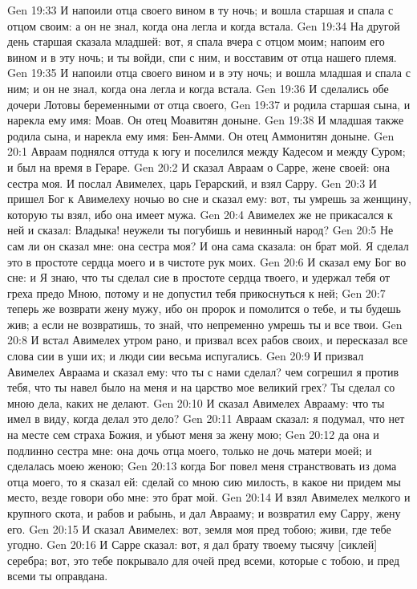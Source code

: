 Gen 19:33  И напоили отца своего вином в ту ночь; и вошла старшая и спала с отцом своим: а он не знал, когда она легла и когда встала.
Gen 19:34  На другой день старшая сказала младшей: вот, я спала вчера с отцом моим; напоим его вином и в эту ночь; и ты войди, спи с ним, и восставим от отца нашего племя.
Gen 19:35  И напоили отца своего вином и в эту ночь; и вошла младшая и спала с ним; и он не знал, когда она легла и когда встала.
Gen 19:36  И сделались обе дочери Лотовы беременными от отца своего,
Gen 19:37  и родила старшая сына, и нарекла ему имя: Моав. Он отец Моавитян доныне.
Gen 19:38  И младшая также родила сына, и нарекла ему имя: Бен-Амми. Он отец Аммонитян доныне.
Gen 20:1  Авраам поднялся оттуда к югу и поселился между Кадесом и между Суром; и был на время в Гераре.
Gen 20:2  И сказал Авраам о Сарре, жене своей: она сестра моя. И послал Авимелех, царь Герарский, и взял Сарру.
Gen 20:3  И пришел Бог к Авимелеху ночью во сне и сказал ему: вот, ты умрешь за женщину, которую ты взял, ибо она имеет мужа.
Gen 20:4  Авимелех же не прикасался к ней и сказал: Владыка! неужели ты погубишь и невинный народ?
Gen 20:5  Не сам ли он сказал мне: она сестра моя? И она сама сказала: он брат мой. Я сделал это в простоте сердца моего и в чистоте рук моих.
Gen 20:6  И сказал ему Бог во сне: и Я знаю, что ты сделал сие в простоте сердца твоего, и удержал тебя от греха предо Мною, потому и не допустил тебя прикоснуться к ней;
Gen 20:7  теперь же возврати жену мужу, ибо он пророк и помолится о тебе, и ты будешь жив; а если не возвратишь, то знай, что непременно умрешь ты и все твои.
Gen 20:8  И встал Авимелех утром рано, и призвал всех рабов своих, и пересказал все слова сии в уши их; и люди сии весьма испугались.
Gen 20:9  И призвал Авимелех Авраама и сказал ему: что ты с нами сделал? чем согрешил я против тебя, что ты навел было на меня и на царство мое великий грех? Ты сделал со мною дела, каких не делают.
Gen 20:10  И сказал Авимелех Аврааму: что ты имел в виду, когда делал это дело?
Gen 20:11  Авраам сказал: я подумал, что нет на месте сем страха Божия, и убьют меня за жену мою;
Gen 20:12  да она и подлинно сестра мне: она дочь отца моего, только не дочь матери моей; и сделалась моею женою;
Gen 20:13  когда Бог повел меня странствовать из дома отца моего, то я сказал ей: сделай со мною сию милость, в какое ни придем мы место, везде говори обо мне: это брат мой.
Gen 20:14  И взял Авимелех мелкого и крупного скота, и рабов и рабынь, и дал Аврааму; и возвратил ему Сарру, жену его.
Gen 20:15  И сказал Авимелех: вот, земля моя пред тобою; живи, где тебе угодно.
Gen 20:16  И Сарре сказал: вот, я дал брату твоему тысячу [сиклей] серебра; вот, это тебе покрывало для очей пред всеми, которые с тобою, и пред всеми ты оправдана.
